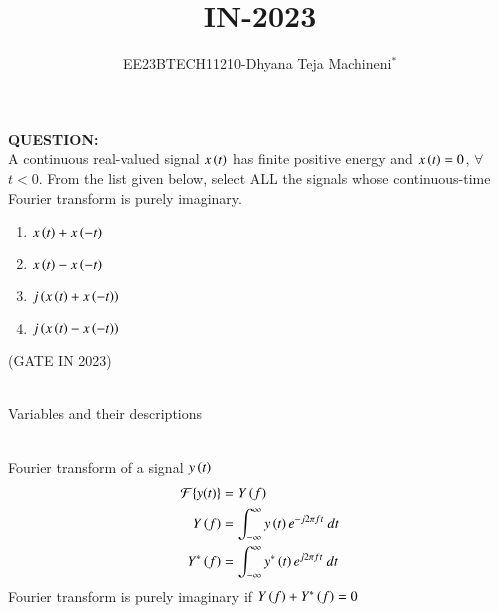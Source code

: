 \documentclass[journal,12pt,twocolumn]{IEEEtran}
\theoremstyle{remark}
\begin{document}

\vspace{3cm}
\title{\textbf{IN-2023}}
\author{EE23BTECH11210-Dhyana Teja Machineni$^{*}$%
}
\maketitle
\newpage
\bigskip

\textbf{QUESTION:}\\
A continuous real-valued signal $x\left(t\right)$ has finite positive energy and $x\left(t\right) = 0$, $\forall$ $t < 0$. From the list given below, select ALL the signals whose
continuous-time Fourier transform is purely imaginary.\\
\begin{enumerate}
\item$x\left(t\right) + x\left(-t\right)$
\item$x\left(t\right) - x\left(-t\right)$
\item$j\left(x\left(t\right) + x\left(-t\right)\right)$
\item$j\left(x\left(t\right) - x\left(-t\right)\right)$
\end{enumerate}
\hfill{(GATE IN 2023)}\\
\solution\\
\fi
\begin{table}[h]
         
         \caption{Variables and their descriptions}
     \end{table}\\
Fourier transform of a signal $y\left(t\right)$\\
\begin{align}
\mathcal{F}\{y(t)\} &= Y\left(f\right)\\
Y\left(f\right)&=\int_{-\infty}^{\infty} y\left(t\right) e^{-j 2\pi f t} \ dt\\
Y^*\left(f\right)&=\int_{-\infty}^{\infty} y^*\left(t\right) e^{j 2\pi f t} \ dt
\end{align}
Fourier transform is purely imaginary if $Y\left(f\right)+Y^*\left(f\right)=0$\\
\end{document}

